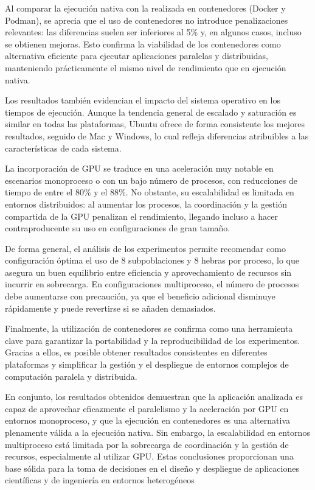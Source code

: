 Al comparar la ejecución nativa con la realizada en contenedores (Docker y Podman), se aprecia que el uso de contenedores no introduce penalizaciones relevantes: las diferencias suelen ser inferiores al 5\% y, en algunos casos, incluso se obtienen mejoras. Esto confirma la viabilidad de los contenedores como alternativa eficiente para ejecutar aplicaciones paralelas y distribuidas, manteniendo prácticamente el mismo nivel de rendimiento que en ejecución nativa.

Los resultados también evidencian el impacto del sistema operativo en los tiempos de ejecución. Aunque la tendencia general de escalado y saturación es similar en todas las plataformas, Ubuntu ofrece de forma consistente los mejores resultados, seguido de Mac y Windows, lo cual refleja diferencias atribuibles a las características de cada sistema.

La incorporación de GPU se traduce en una aceleración muy notable en escenarios monoproceso o con un bajo número de procesos, con reducciones de tiempo de entre el 80\% y el 88\%. No obstante, su escalabilidad es limitada en entornos distribuidos: al aumentar los procesos, la coordinación y la gestión compartida de la GPU penalizan el rendimiento, llegando incluso a hacer contraproducente su uso en configuraciones de gran tamaño.

De forma general, el análisis de los experimentos permite recomendar como configuración óptima el uso de 8 subpoblaciones y 8 hebras por proceso, lo que asegura un buen equilibrio entre eficiencia y aprovechamiento de recursos sin incurrir en sobrecarga. En configuraciones multiproceso, el número de procesos debe aumentarse con precaución, ya que el beneficio adicional disminuye rápidamente y puede revertirse si se añaden demasiados.

Finalmente, la utilización de contenedores se confirma como una herramienta clave para garantizar la portabilidad y la reproducibilidad de los experimentos. Gracias a ellos, es posible obtener resultados consistentes en diferentes plataformas y simplificar la gestión y el despliegue de entornos complejos de computación paralela y distribuida.

En conjunto, los resultados obtenidos demuestran que la aplicación analizada es capaz de aprovechar eficazmente el paralelismo y la aceleración por GPU en entornos monoproceso, y que la ejecución en contenedores es una alternativa plenamente válida a la ejecución nativa. Sin embargo, la escalabilidad en entornos multiproceso está limitada por la sobrecarga de coordinación y la gestión de recursos, especialmente al utilizar GPU. Estas conclusiones proporcionan una base sólida para la toma de decisiones en el diseño y despliegue de aplicaciones científicas y de ingeniería en entornos heterogéneos

